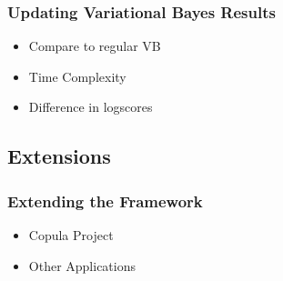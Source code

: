\documentclass[11pt]{beamer}\usepackage[]{graphicx}\usepackage[]{color}
\begin{document}
\begin{frame}
\frametitle{Updating Variational Bayes Results}
\begin{itemize}
\item Compare to regular VB
\item Time Complexity
\item Difference in logscores
\end{itemize}
\end{frame}

\begin{frame}
\section{Extensions}
\frametitle{Extending the Framework}
\begin{itemize}
\item Copula Project
\item Other Applications
\end{itemize}
\end{frame}
\end{document}
